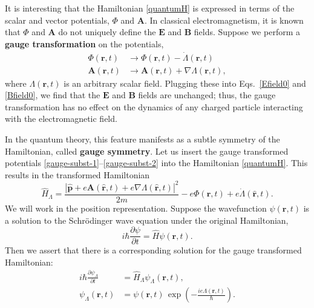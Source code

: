 \documentclass[prx,12pt]{revtex4-2}
\begin{document}
It is interesting that the Hamiltonian \eqref{quantumH} is expressed
in terms of the scalar and vector potentials, $\Phi$ and $\mathbf{A}$.
In classical electromagnetism, it is known that $\Phi$ and
$\mathbf{A}$ do not uniquely define the $\mathbf{E}$ and $\mathbf{B}$
fields.  Suppose we perform a \textbf{gauge transformation} on the
potentials,
\begin{align}
  \Phi(\mathbf{r},t) &\rightarrow \Phi(\mathbf{r},t) - \dot{\Lambda}(\mathbf{r},t) \label{gauge-subst-1} \\
  \mathbf{A}(\mathbf{r},t) &\rightarrow
  \mathbf{A}(\mathbf{r},t) + \nabla{\Lambda}(\mathbf{r},t),
  \label{gauge-subst-2}
\end{align}
where $\Lambda(\mathbf{r},t)$ is an arbitrary scalar field.  Plugging
these into Eqs.~\eqref{Efield0} and \eqref{Bfield0}, we find that the
$\mathbf{E}$ and $\mathbf{B}$ fields are unchanged; thus, the gauge
transformation has no effect on the dynamics of any charged particle
interacting with the electromagnetic field.

In the quantum theory, this feature manifests as a subtle symmetry of
the Hamiltonian, called \textbf{gauge symmetry}.  Let us insert the
gauge transformed potentials
\eqref{gauge-subst-1}--\eqref{gauge-subst-2} into the Hamiltonian
\eqref{quantumH}.  This results in the transformed Hamiltonian
\begin{equation}
  \hat{H}_\Lambda
  = \frac{|\hat{\mathbf{p}}+e\mathbf{A}(\hat{\mathbf{r}},t) + e\nabla\Lambda(\hat{\mathbf{r}},t)|^2}{2m}
  - e\Phi(\hat{\mathbf{r}},t) + e\dot{\Lambda}(\hat{\mathbf{r}},t).
  \label{Hlambda}
\end{equation}
We will work in the position representation.  Suppose the wavefunction
$\psi(\mathbf{r},t)$ is a solution to the Schr\"odinger wave equation
under the original Hamiltonian,
\begin{equation}
  i\hbar\frac{\partial\psi}{\partial t} =
  \hat{H} \psi(\mathbf{r},t).
  \label{origschrod}
\end{equation}
Then we assert that there is a corresponding solution for the gauge
transformed Hamiltonian:
\begin{align}
  i\hbar\frac{\partial \psi_\Lambda}{\partial t} &=
  \hat{H}_\Lambda \psi_\Lambda(\mathbf{r},t),
  \label{gaugeschrod} \\
  \psi_\Lambda(\mathbf{r},t) &=
  \psi(\mathbf{r}, t)\, \exp\left(-\frac{ie\Lambda(\mathbf{r}, t)}{\hbar}\right).
  \label{gaugepsi}
\end{align}
\end{document}
